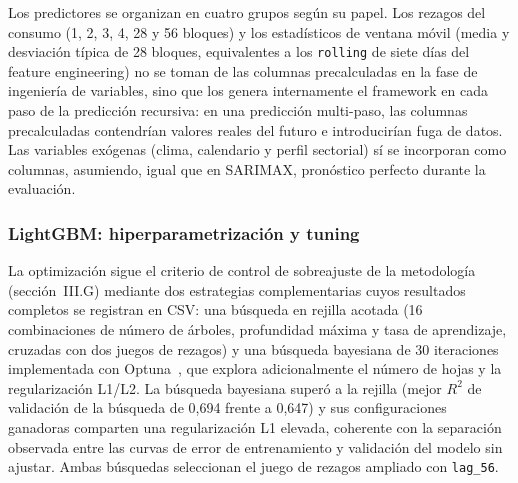 \documentclass[12pt, a4paper]{article}
\begin{document}
Los predictores se organizan en cuatro grupos según su papel. Los rezagos del consumo (1, 2, 3, 4, 28 y 56 bloques) y los estadísticos de ventana móvil (media y desviación típica de 28 bloques, equivalentes a los \texttt{rolling} de siete días del feature engineering) no se toman de las columnas precalculadas en la fase de ingeniería de variables, sino que los genera internamente el framework en cada paso de la predicción recursiva: en una predicción multi-paso, las columnas precalculadas contendrían valores reales del futuro e introducirían fuga de datos. Las variables exógenas (clima, calendario y perfil sectorial) sí se incorporan como columnas, asumiendo, igual que en SARIMAX, pronóstico perfecto durante la evaluación.

\subsubsection{LightGBM: hiperparametrización y tuning}

La optimización sigue el criterio de control de sobreajuste de la metodología (sección~III.G) mediante dos estrategias complementarias cuyos resultados completos se registran en CSV: una búsqueda en rejilla acotada (16 combinaciones de número de árboles, profundidad máxima y tasa de aprendizaje, cruzadas con dos juegos de rezagos) y una búsqueda bayesiana de 30 iteraciones implementada con Optuna~\cite{optuna2019}, que explora adicionalmente el número de hojas y la regularización L1/L2. La búsqueda bayesiana superó a la rejilla (mejor $R^2$ de validación de la búsqueda de 0,694 frente a 0,647) y sus configuraciones ganadoras comparten una regularización L1 elevada, coherente con la separación observada entre las curvas de error de entrenamiento y validación del modelo sin ajustar. Ambas búsquedas seleccionan el juego de rezagos ampliado con \texttt{lag\_56}.
\end{document}
